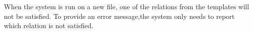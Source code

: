 When the system is run on a new file, one of the relations from the templates will not be satisfied.
To provide an error message,the system only needs to report which relation is not satisfied.

